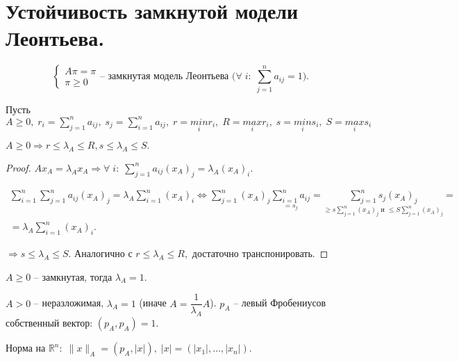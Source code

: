 \chapter{Устойчивость замкнутой модели Леонтьева.}\label{cha:9}

$$\begin{cases}
	A \pi = \pi \\
	\pi \geq 0
\end{cases} \text{-- замкнутая модель Леонтьева (} \forall \; i: \; \sum\limits_{j = 1}^n a_{ij} = 1 \text{).}$$

Пусть $A \geq 0, \; r_i = \sum\limits_{j = 1}^n a_{ij}, \; s_j = \sum\limits_{i = 1}^n a_{ij}, \; r = \underset{i}{min}r_i, \; R = \underset{i}{max}r_i, \; s = \underset{i}{min}s_i, \; S = \underset{i}{max}s_i$

\begin{clair}
	$A \geq 0 \Rightarrow r \leq \lambda_A \leq R, s \leq \lambda_A \leq S.$
\end{clair}

\begin{proof}
	$Ax_A = \lambda_A x_A \Rightarrow \forall \; i: \; \sum\limits_{j = 1}^n a_{ij} (x_A)_j = \lambda_A (x_A)_i.$

	$$\begin{gathered}
		\sum\limits_{i = 1}^n \sum\limits_{j = 1}^n a_{ij} (x_A)_j = \lambda_A \sum\limits_{i = 1}^n (x_A)_i \Longleftrightarrow \sum\limits_{j = 1}^n (x_A)_j \underset{= s_j}{\sum\limits_{i = 1}^n a_{ij}} = \underset{\geq s\sum\limits_{j = 1}^n (x_A)_j \text{ и } \leq S\sum\limits_{j = 1}^n (x_A)_j}{\sum\limits_{j = 1}^n s_j (x_A)_j} = \\
		= \lambda_A \sum\limits_{i = 1}^n (x_A)_i.
	\end{gathered}$$

	$\Rightarrow s \leq \lambda_A \leq S. \text{ Аналогично с  } r \leq \lambda_A \leq R, \text{ достаточно транспонировать.}$
\end{proof}

\begin{conseq}
	$A \geq 0$ -- замкнутая, тогда $\lambda_A = 1.$
\end{conseq}

\begin{definition}
	$A > 0$ -- неразложимая, $\lambda_A = 1$ (иначе $A = \dfrac{1}{\lambda_A}A$). $p_A$ -- левый Фробениусов собственный вектор: $(p_A, p_A) = 1.$
\end{definition}

\begin{definition}
	Норма на $\mathbb{R}^n: \; \| x\|_A = (p_A, |x|), \; |x| = (|x_1|, \ldots, |x_n|).$
\end{definition}

